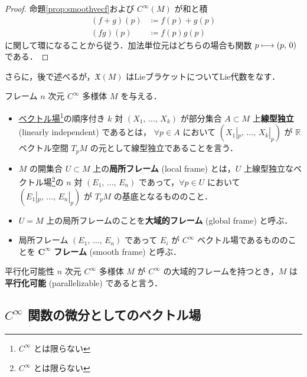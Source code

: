 \documentclass[TQFT_main]{subfiles}
\begin{document}
\begin{proof}
    命題\ref{prop:smoothvecf}および $C^\infty(M)$ が和と積
    \begin{align}
        (f + g)(p) &\coloneqq f(p) + g(p) \\
        (fg)(p) &\coloneqq f(p) g(p)
    \end{align}
    に関して環になることから従う．加法単位元はどちらの場合も関数 $p \longmapsto (p,\, 0)$ である．
\end{proof}

さらに，後で述べるが，$\mathfrak{X}(M)$ はLieブラケットについてLie代数をなす．

\begin{mydef}[label=def:smoothframe]{フレーム}
    $n$ 次元 $C^\infty$ 多様体 $M$ を与える．
    \begin{itemize}
        \item \hyperref[def:vecf]{ベクトル場}\footnote{$C^\infty$ とは限らない}の順序付き $k$ 対 $(X_1,\, \dots,\, X_k)$ が部分集合 $A \subset M$ 上\textbf{線型独立} (linearly independent) であるとは， $\forall p \in A$ において $(X_1|_p,\, \dots,\, X_k|_p)$ が $\mathbb{R}$ ベクトル空間 $T_p M$ の元として線型独立であることを言う．
        \item $M$ の開集合 $U \subset M$ 上の\textbf{局所フレーム} (local frame) とは，$U$ 上線型独立なベクトル場\footnote{$C^\infty$ とは限らない}の $n$ 対 $(E_1,\, \dots,\, E_n)$ であって，$\forall p \in U$ において $(E_1|_p,\, \dots,\, E_n|_p)$ が $T_p M$ の基底となるもののこと．
        \item $U = M$ 上の局所フレームのことを\textbf{大域的フレーム} (global frame) と呼ぶ．
        \item 局所フレーム  $(E_1,\, \dots,\, E_n)$ であって $E_i$ が $C^\infty$ ベクトル場であるもののことを $\bm{C^\infty}$ \textbf{フレーム} (smooth frame) と呼ぶ．
    \end{itemize}
\end{mydef}

\begin{mydef}[label=def:parallel]{平行化可能性}
    $n$ 次元 $C^\infty$ 多様体 $M$ が $C^\infty$ の大域的フレームを持つとき，$M$ は\textbf{平行化可能} (parallelizable) であると言う．
\end{mydef}


\subsection{$C^\infty$ 関数の微分としてのベクトル場}
\end{document}
